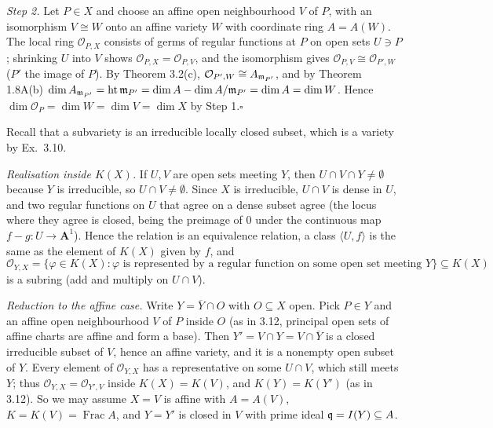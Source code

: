 \documentclass[11pt]{article}
\begin{document}
\emph{Step 2.} Let $P\in X$ and choose an affine open neighbourhood $V$ of $P$, with an isomorphism $V\cong W$ onto an affine variety $W$ with coordinate ring $A=A(W)$. The local ring $\mathcal{O}_{P,X}$ consists of germs of regular functions at $P$ on open sets $U\ni P$; shrinking $U$ into $V$ shows $\mathcal{O}_{P,X}=\mathcal{O}_{P,V}$, and the isomorphism gives $\mathcal{O}_{P,V}\cong\mathcal{O}_{P',W}$ ($P'$ the image of $P$). By Theorem 3.2(c), $\mathcal{O}_{P',W}\cong A_{\mathfrak m_{P'}}$, and by Theorem 1.8A(b) $\dim A_{\mathfrak m_{P'}}=\operatorname{ht}\mathfrak m_{P'}=\dim A-\dim A/\mathfrak m_{P'}=\dim A=\dim W$. Hence $\dim\mathcal{O}_P=\dim W=\dim V=\dim X$ by Step 1.\hfill$\square$

\pf
Recall that a subvariety is an irreducible locally closed subset, which is a variety by Ex.~3.10.

\emph{Realisation inside $K(X)$.} If $U,V$ are open sets meeting $Y$, then $U\cap V\cap Y\ne\emptyset$ because $Y$ is irreducible, so $U\cap V\neq\emptyset$. Since $X$ is irreducible, $U\cap V$ is dense in $U$, and two regular functions on $U$ that agree on a dense subset agree (the locus where they agree is closed, being the preimage of $0$ under the continuous map $f-g\colon U\to\mathbf A^1$). Hence the relation is an equivalence relation, a class $\langle U,f\rangle$ is the same as the element of $K(X)$ given by $f$, and
\[
\mathcal{O}_{Y,X}=\{\varphi\in K(X): \varphi\text{ is represented by a regular function on some open set meeting }Y\}\subseteq K(X)
\]
is a subring (add and multiply on $U\cap V$).

\emph{Reduction to the affine case.} Write $Y=\overline Y\cap O$ with $O\subseteq X$ open. Pick $P\in Y$ and an affine open neighbourhood $V$ of $P$ inside $O$ (as in 3.12, principal open sets of affine charts are affine and form a base). Then $Y'=V\cap Y=V\cap\overline Y$ is a closed irreducible subset of $V$, hence an affine variety, and it is a nonempty open subset of $Y$. Every element of $\mathcal{O}_{Y,X}$ has a representative on some $U\cap V$, which still meets $Y$; thus $\mathcal{O}_{Y,X}=\mathcal{O}_{Y',V}$ inside $K(X)=K(V)$, and $K(Y)=K(Y')$ (as in 3.12). So we may assume $X=V$ is affine with $A=A(V)$, $K=K(V)=\operatorname{Frac}A$, and $Y=Y'$ is closed in $V$ with prime ideal $\mathfrak q=I(Y)\subseteq A$.
\end{document}
